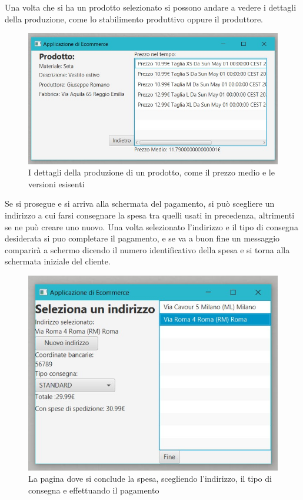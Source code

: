 \documentclass[a4paper,12pt]{report}
\begin{document}
Una volta che si ha un prodotto selezionato si possono andare a vedere i dettagli della produzione, come lo stabilimento produttivo oppure il produttore.
\begin{figure}[H]
	\centering{}
	\includegraphics[width=\textwidth]{img/Application/ClientMenu3.jpg}
	\caption{I dettagli della produzione di un prodotto, come il prezzo medio e le versioni esisenti}
\end{figure}
Se si prosegue e si arriva alla schermata del pagamento, si può scegliere un indirizzo a cui 
farsi consegnare la spesa tra quelli usati in precedenza, altrimenti se ne può creare uno nuovo. 
Una volta selezionato l'indirizzo e il tipo di consegna desiderata si puo completare il pagamento, 
e se va a buon fine un messaggio comparirà a schermo dicendo il numero identificativo della spesa e si torna alla schermata iniziale del cliente.
\begin{figure}[H]
	\centering{}
	\includegraphics[width=\textwidth]{img/Application/ClientMenu4.jpg}
	\caption{La pagina dove si conclude la spesa, scegliendo l'indirizzo, il tipo di consegna e effettuando il pagamento}
\end{figure}
\end{document}
